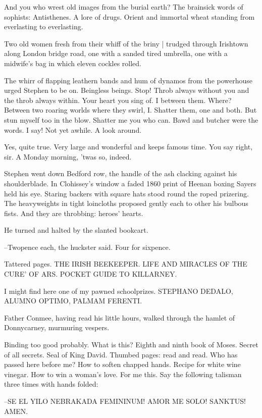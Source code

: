 And you who wrest old images from the burial earth?
The brainsick words of sophists:
Antisthenes.
A lore of drugs.
Orient and immortal wheat
standing from everlasting to everlasting.

Two old women
fresh from their whiff of the briny |
trudged through Irishtown along London bridge road,
one with a sanded tired umbrella,
one with a midwife's bag
in which eleven cockles rolled.

The whirr of flapping leathern bands
and hum of dynamos from the
powerhouse
urged Stephen to be on.
Beingless beings.
Stop!
Throb always
without you and the throb always within.
Your heart you sing of.
I
between them.
Where?
Between two roaring worlds where they swirl, I.
Shatter them, one and both.
But stun myself too in the blow.
Shatter me
you who can.
Bawd and butcher were the words.
I say!
Not yet awhile.
A
look around.

Yes, quite true.
Very large and wonderful and keeps famous time.
You say
right, sir.
A Monday morning, 'twas so, indeed.

Stephen went down Bedford row,
the handle of the ash
clacking against his
shoulderblade.
In Clohissey's window
a faded 1860 print of Heenan boxing
Sayers
held his eye.
Staring backers with square hats
stood round the
roped prizering.
The heavyweights in tight loincloths proposed gently
each to other
his bulbous fists.
And they are throbbing:
heroes' hearts.

He turned and halted by the slanted bookcart.

--Twopence each,
the huckster said.
Four for sixpence.

Tattered pages.
THE IRISH BEEKEEPER.
LIFE AND MIRACLES OF THE CURE' OF
ARS.
POCKET GUIDE TO KILLARNEY.

I might find here one of my pawned schoolprizes.
STEPHANO DEDALO, ALUMNO OPTIMO, PALMAM FERENTI.

Father Conmee, having read his little hours,
walked through the hamlet of
Donnycarney,
murmuring vespers.

Binding too good probably.
What is this?
Eighth and ninth book of Moses.
Secret of all secrets.
Seal of King David.
Thumbed pages: read and read.
Who has passed here before me?
How to soften chapped hands.
Recipe for
white wine vinegar.
How to win a woman's love.
For me this.
Say the
following talisman three times with hands folded:

--SE EL YILO NEBRAKADA FEMININUM!
AMOR ME SOLO!
SANKTUS!
AMEN.


